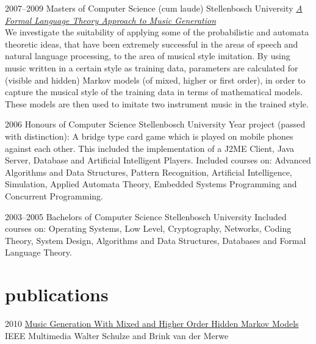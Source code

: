 \documentclass[]{friggeri-cv} %
\begin{document}
\begin{entrylist}

\entry
{2007--2009}
{Masters {\normalfont of Computer Science} (cum laude)}
{Stellenbosch University}
{\href{http://superwillow.sourceforge.net/}{\emph{A Formal Language Theory Approach to Music Generation}} \\ We investigate the suitability of applying some of the probabilistic and automata theoretic ideas, that have been extremely successful in the areas of speech and natural language processing, to the area of musical style imitation. By using music written in a certain style as training data, parameters are calculated for (visible and hidden) Markov models (of mixed, higher or first order), in order to capture the musical style of the training data in terms of mathematical models. These models are then used to imitate two instrument music in the trained style.}

\entry
{2006}
{Honours {\normalfont of Computer Science}}
{Stellenbosch University}
{Year project (passed with distinction): A bridge type card game which is played on mobile phones against each other. This included the implementation of a J2ME Client, Java Server, Database and Artificial Intelligent Players.
Included courses on: Advanced Algorithms and Data Structures, Pattern Recognition, Artificial Intelligence, Simulation, Applied Automata Theory, Embedded Systems Programming and Concurrent Programming.}

\end{entrylist}

\begin{entrylist}

\entry
{2003--2005}
{Bachelors {\normalfont of Computer Science}}
{Stellenbosch University}
{Included courses on: Operating Systems, Low Level, Cryptography, Networks, Coding Theory, System Design, Algorithms and Data Structures, Databases and Formal Language Theory.}

\end{entrylist}

\section{publications}

\begin{entrylist}

\entry
{2010}
{\href{http://doi.ieeecomputersociety.org/10.1109/MMUL.2010.44}{Music Generation With Mixed and Higher Order Hidden Markov Models}}
{IEEE Multimedia}
{Walter Schulze and Brink van der Merwe}

\end{entrylist}
\end{document}
